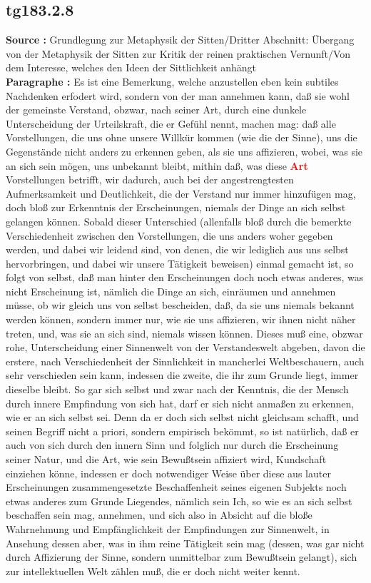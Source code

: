\documentclass[a4paper,12pt,twoside]{book}
\newcommand{\match}[1]{\textcolor{red}{\textbf{#1}}}
\begin{document}
	\subsection*{tg183.2.8} 
	\textbf{Source : }Grundlegung zur Metaphysik der Sitten/Dritter Abschnitt: Übergang von der Metaphysik der Sitten zur Kritik der reinen praktischen Vernunft/Von dem Interesse, welches den Ideen der Sittlichkeit anhängt\\  
	
	\noindent\textbf{Paragraphe : }Es ist eine Bemerkung, welche anzustellen eben kein subtiles Nachdenken erfodert wird, sondern von der man annehmen kann, daß sie wohl der gemeinste Verstand, obzwar, nach seiner Art, durch eine dunkele Unterscheidung der Urteilskraft, die er Gefühl nennt, machen mag: daß alle Vorstellungen, die uns ohne unsere Willkür kommen (wie die der Sinne), uns die Gegenstände nicht anders zu erkennen geben, als sie uns affizieren, wobei, was sie an sich sein mögen, uns unbekannt bleibt, mithin daß, was diese \match{Art} Vorstellungen betrifft, wir dadurch, auch bei der angestrengtesten Aufmerksamkeit und Deutlichkeit, die der Verstand nur immer hinzufügen mag, doch bloß zur Erkenntnis der Erscheinungen, niemals der Dinge an sich selbst gelangen können. Sobald dieser Unterschied (allenfalls bloß durch die bemerkte Verschiedenheit zwischen den Vorstellungen, die uns anders woher gegeben werden, und dabei wir leidend sind, von denen, die wir lediglich aus uns selbst hervorbringen, und dabei wir unsere Tätigkeit beweisen) einmal gemacht ist, so folgt von selbst, daß man hinter den Erscheinungen doch noch etwas anderes, was nicht Erscheinung  ist, nämlich die Dinge an sich, einräumen und annehmen müsse, ob wir gleich uns von selbst bescheiden, daß, da sie uns niemals bekannt werden können, sondern immer nur, wie sie uns affizieren, wir ihnen nicht näher treten, und, was sie an sich sind, niemals wissen können. Dieses muß eine, obzwar rohe, Unterscheidung einer Sinnenwelt von der Verstandeswelt abgeben, davon die erstere, nach Verschiedenheit der Sinnlichkeit in mancherlei Weltbeschauern, auch sehr verschieden sein kann, indessen die zweite, die ihr zum Grunde liegt, immer dieselbe bleibt. So gar sich selbst und zwar nach der Kenntnis, die der Mensch durch innere Empfindung von sich hat, darf er sich nicht anmaßen zu erkennen, wie er an sich selbst sei. Denn da er doch sich selbst nicht gleichsam schafft, und seinen Begriff nicht a priori, sondern empirisch bekömmt, so ist natürlich, daß er auch von sich durch den innern Sinn und folglich nur durch die Erscheinung seiner Natur, und die Art, wie sein Bewußtsein affiziert wird, Kundschaft einziehen könne, indessen er doch notwendiger Weise über diese aus lauter Erscheinungen zusammengesetzte Beschaffenheit seines eigenen Subjekts noch etwas anderes zum Grunde Liegendes, nämlich sein Ich, so wie es an sich selbst beschaffen sein mag, annehmen, und sich also in Absicht auf die bloße Wahrnehmung und Empfänglichkeit der Empfindungen zur Sinnenwelt, in Ansehung dessen aber, was in ihm reine Tätigkeit sein mag (dessen, was gar nicht durch Affizierung der Sinne, sondern unmittelbar zum Bewußtsein gelangt), sich zur intellektuellen Welt zählen muß, die er doch nicht weiter kennt. 
	
\end{document}
